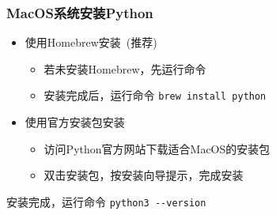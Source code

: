 \begin{frame}[fragile]
	\frametitle{\textrm{MacOS}系统安装\textrm{Python}}
    \begin{itemize}
	    \item 使用\textrm{Homebrew}安装~(推荐)
            \begin{itemize}
		    \item 若未安装\textrm{Homebrew}，先运行命令~\\
			{\fontsize{8.2pt}{4.2pt}\selectfont{\verb|/bin/bash -c "$(curl -fsSL https://raw.githubusercontent.com/Homebrew/install/HEAD/install.sh)"|}}
			    {\fontsize{7.2pt}{4.2pt}}
                \item 安装完成后，运行命令 \verb|brew install python|\\
			{\fontsize{7.2pt}{4.2pt}}
            \end{itemize}
        \item 使用官方安装包安装
            \begin{itemize}
		    \item 访问\textrm{Python}官方网站下载适合\textrm{MacOS}的安装包
                \item 双击安装包，按安装向导提示，完成安装
            \end{itemize}
    \end{itemize}
                安装完成，运行命令 \verb|python3 --version|\\
			{\fontsize{7.2pt}{4.2pt}}
\end{frame}

